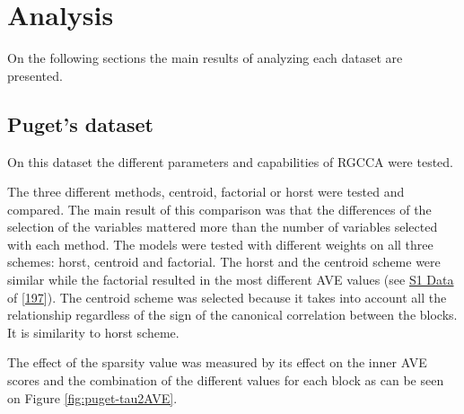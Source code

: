 \documentclass[
  12pt,
  a4paper,
  twoside,
  openright]{book}
\begin{document}
\hypertarget{analysis}{%
\section{Analysis}\label{analysis}}

On the following sections the main results of analyzing each dataset are presented.

\hypertarget{results-puget}{%
\subsection{Puget's dataset}\label{results-puget}}

On this dataset the different parameters and capabilities of RGCCA were tested.

The three different methods, centroid, factorial or horst were tested and compared.
The main result of this comparison was that the differences of the selection of the variables mattered more than the number of variables selected with each method.
The models were tested with different weights on all three schemes: horst, centroid and factorial.
The horst and the centroid scheme were similar while the factorial resulted in the most different AVE values (see \href{https://journals.plos.org/plosone/article?id=10.1371/journal.pone.0246367\#pone.0246367.s001}{S1 Data} of {[}\protect\hyperlink{ref-revilla2021}{197}{]}).
The centroid scheme was selected because it takes into account all the relationship regardless of the sign of the canonical correlation between the blocks.
It is similarity to horst scheme.

The effect of the sparsity value was measured by its effect on the inner AVE scores and the combination of the different values for each block as can be seen on Figure \ref{fig:puget-tau2AVE}.
\end{document}

